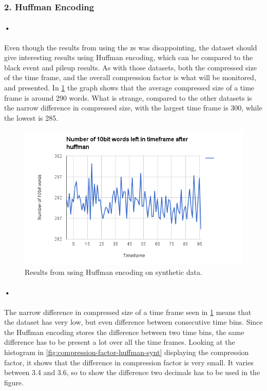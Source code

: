 \documentclass[a4paper, 12pt]{report}
\begin{document}
\subsubsection{2. Huffman Encoding}

\paragraph{•}
Even though the results from using the \gls{zs} was disappointing, the dataset should give interesting results using Huffman encoding, which can be compared to the black event and pileup results.
As with those datasets, both the compressed size of the time frame, and the overall compression factor is what will be monitored, and presented.
In \ref{fig:synthetic-huffman} the graph shows that the average compressed size of a time frame is around 290 words.
What is strange, compared to the other datasets is the narrow difference in compressed size, with the largest time frame is 300, while the lowest is 285.


\begin{figure}[h!]
	\centering
		\includegraphics[width=1.0\textwidth]{images/huffman-fake-pileup.png}
		\caption{Results from using Huffman encoding on synthetic data.}
		\label{fig:synthetic-huffman}
\end{figure}

\paragraph{•}
The narrow difference in compressed size of a time frame seen in \ref{fig:synthetic-huffman} means that the dataset has very low, but even difference between consecutive time bins.
Since the Huffman encoding stores the difference between two time bins, the same difference has to be present a lot over all the time frames.
Looking at the histogram in \ref{fig:compression-factor-huffman-synt} displaying the compression factor, it shows that the difference in compression factor is very small.
It varies between 3.4 and 3.6, so to show the difference two decimals has to be used in the figure.
\end{document}
